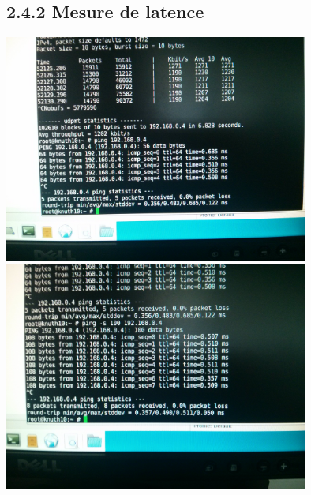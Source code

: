 \documentclass{report}
\begin{document}
\subsection*{2.4.2 Mesure de latence}
\includegraphics[width=10cm]{screen9.jpg}\\
\includegraphics[width=10cm]{screen10.jpg}
\end{document}
